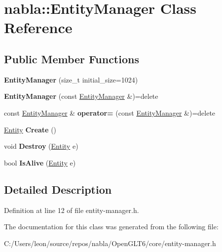 \hypertarget{classnabla_1_1_entity_manager}{}\section{nabla\+::Entity\+Manager Class Reference}
\label{classnabla_1_1_entity_manager}
\subsection*{Public Member Functions}
\begin{DoxyCompactItemize}
\item 
\mbox{\label{classnabla_1_1_entity_manager_ab25574ad61a0c1eb347e764ff7ae5127}} 
{\bfseries Entity\+Manager} (size\+\_\+t initial\+\_\+size=1024)
\item 
\mbox{\label{classnabla_1_1_entity_manager_a4d638392cf93db8ffd2f905d492d3844}} 
{\bfseries Entity\+Manager} (const \mbox{\hyperlink{classnabla_1_1_entity_manager}{Entity\+Manager}} \&)=delete
\item 
\mbox{\label{classnabla_1_1_entity_manager_a49c8656945507bf10bd03d66178c4b7a}} 
const \mbox{\hyperlink{classnabla_1_1_entity_manager}{Entity\+Manager}} \& {\bfseries operator=} (const \mbox{\hyperlink{classnabla_1_1_entity_manager}{Entity\+Manager}} \&)=delete
\item 
\mbox{\label{classnabla_1_1_entity_manager_a8b40cde679503899a48047863dcd574b}} 
\mbox{\hyperlink{structnabla_1_1_entity}{Entity}} {\bfseries Create} ()
\item 
\mbox{\label{classnabla_1_1_entity_manager_ae878657ba6694c9d9d73a758fe8e0a63}} 
void {\bfseries Destroy} (\mbox{\hyperlink{structnabla_1_1_entity}{Entity}} e)
\item 
\mbox{\label{classnabla_1_1_entity_manager_aa1a4c386de6b8d24c8da3e596164cef7}} 
bool {\bfseries Is\+Alive} (\mbox{\hyperlink{structnabla_1_1_entity}{Entity}} e)
\end{DoxyCompactItemize}


\subsection{Detailed Description}


Definition at line 12 of file entity-\/manager.\+h.



The documentation for this class was generated from the following file\+:\begin{DoxyCompactItemize}
\item 
C\+:/\+Users/leon/source/repos/nabla/\+Open\+G\+L\+T6/core/entity-\/manager.\+h\end{DoxyCompactItemize}
